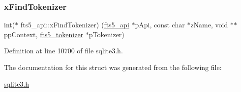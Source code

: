 \subsubsection{\texorpdfstring{x\+Find\+Tokenizer}{xFindTokenizer}}
{\footnotesize\ttfamily int($\ast$ fts5\+\_\+api\+::x\+Find\+Tokenizer) (\mbox{\hyperlink{structfts5__api}{fts5\+\_\+api}} $\ast$p\+Api, const char $\ast$z\+Name, void $\ast$$\ast$pp\+Context, \mbox{\hyperlink{structfts5__tokenizer}{fts5\+\_\+tokenizer}} $\ast$p\+Tokenizer)}



Definition at line 10700 of file sqlite3.\+h.



The documentation for this struct was generated from the following file\+:\begin{DoxyCompactItemize}
\item 
\mbox{\hyperlink{sqlite3_8h}{sqlite3.\+h}}\end{DoxyCompactItemize}
